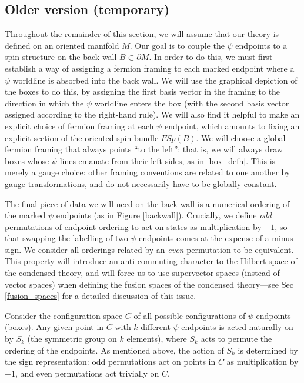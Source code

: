 \documentclass[12pt,a4paper]{article}
\begin{document}
\subsection{Older version (temporary)}
Throughout the remainder of this section, we will assume that our theory is defined on an oriented manifold $M$. 
Our goal is to couple the $\psi$ endpoints to a spin structure on the back wall $B \subset \partial M$. In order to do this, we must first establish a way of assigning a fermion framing to each marked endpoint where a $\psi$ worldline is absorbed into the back wall. 
We will use the graphical depiction of the boxes to do this, by assigning the first basis vector in the framing to the direction in which the $\psi$ worldline enters the box (with the second basis vector assigned according to the right-hand rule).
We will also find it helpful to make an explicit choice of fermion framing at each $\psi$ endpoint, which amounts to fixing an explicit section of the oriented spin bundle $FSp(B)$. 
We will choose a global fermion framing that always points ``to the left'': that is, we will always draw boxes whose $\psi$ lines emanate from their left sides, as in \eqref{box_defn}. 
This is merely a gauge choice: other framing conventions are related to one another by gauge transformations, and do not necessarily have to be globally constant. 

The final piece of data we will need on the back wall is a numerical ordering of the marked $\psi$ endpoints (as in Figure \ref{backwall}). 
Crucially, we define {\it odd} permutations of endpoint ordering to act on states as multiplication by $-1$, so that swapping the labelling of two $\psi$ endpoints comes at the expense of a minus sign. 
We consider all orderings related by an {\it even} permutation to be equivalent. 
This property will introduce an anti-commuting character to the Hilbert space of the condensed theory, and will force us to use supervector spaces (instead of vector spaces) when defining the fusion spaces of the condensed theory---see Sec \ref{fusion_spaces} for a detailed discussion of this issue. 

Consider the configuration space $C$ of all possible configurations of $\psi$ endpoints (boxes). Any given point in $C$ with $k$ different $\psi$ endpoints is acted naturally on by $S_k$ (the symmetric group on $k$ elements), where $S_k$ acts to permute the ordering of the endpoints.
As mentioned above, the action of $S_k$ is determined by the sign representation: odd permutations act on points in $C$ as multiplication by $-1$, and even permutations act trivially on $C$.
\end{document}
